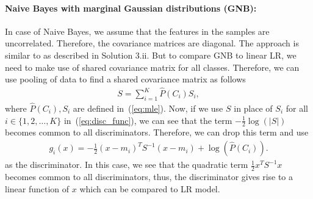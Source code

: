 \paragraph{Naive Bayes with marginal Gaussian distributions (GNB):} In case of Naive Bayes, we assume that the features in the samples are uncorrelated. Therefore, the covariance matrices are diagonal. The approach is similar to as described in Solution 3.ii. But to compare GNB to linear LR, we need to make use of shared covariance matrix for all classes. Therefore, we can use pooling of data to find a shared covariance matrix as follows
\begin{align}
	S = \sum_{i=1}^K \hat{P}(C_i)S_i,
\end{align}
where $\hat{P}(C_i), S_i$ are defined in~(\ref{eq:mle}). Now, if we use $S$ in place of $S_i$ for all $i \in \{1,2,\ldots,K\}$ in~(\ref{eq:disc_func}), we can see that the term $-\frac{1}{2}\log(|S|)$ becomes common to all discriminators. Therefore, we can drop this term and use
\begin{align*}
	g_i(x) = -\frac{1}{2}(x-m_i)^TS^{-1}(x-m_i) + \log(\hat{P}(C_i)).
\end{align*}
as the discriminator. In this case, we see that the quadratic term $\frac{1}{2}x^TS^{-1}x$ becomes common to all discriminators, thus, the discriminator gives rise to a linear function of $x$ which can be compared to LR model.
